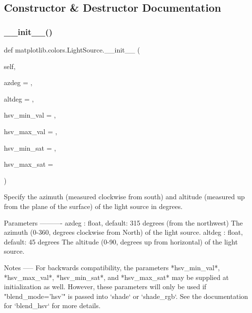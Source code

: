 \subsection{Constructor \& Destructor Documentation}
\mbox{\label{classmatplotlib_1_1colors_1_1LightSource_a40db8291ed06130afff9f8b4dfc99ed5}} 
\subsubsection{\texorpdfstring{\+\_\+\+\_\+init\+\_\+\+\_\+()}{\_\_init\_\_()}}
{\footnotesize\ttfamily def matplotlib.\+colors.\+Light\+Source.\+\_\+\+\_\+init\+\_\+\+\_\+ (\begin{DoxyParamCaption}\item[{}]{self,  }\item[{}]{azdeg = {},  }\item[{}]{altdeg = {},  }\item[{}]{hsv\+\_\+min\+\_\+val = {},  }\item[{}]{hsv\+\_\+max\+\_\+val = {},  }\item[{}]{hsv\+\_\+min\+\_\+sat = {},  }\item[{}]{hsv\+\_\+max\+\_\+sat = {} }\end{DoxyParamCaption})}

\begin{DoxyVerb}Specify the azimuth (measured clockwise from south) and altitude
(measured up from the plane of the surface) of the light source
in degrees.

Parameters
----------
azdeg : float, default: 315 degrees (from the northwest)
    The azimuth (0-360, degrees clockwise from North) of the light
    source.
altdeg : float, default: 45 degrees
    The altitude (0-90, degrees up from horizontal) of the light
    source.

Notes
-----
For backwards compatibility, the parameters *hsv_min_val*,
*hsv_max_val*, *hsv_min_sat*, and *hsv_max_sat* may be supplied at
initialization as well.  However, these parameters will only be used if
"blend_mode='hsv'" is passed into `shade` or `shade_rgb`.
See the documentation for `blend_hsv` for more details.
\end{DoxyVerb}
 


